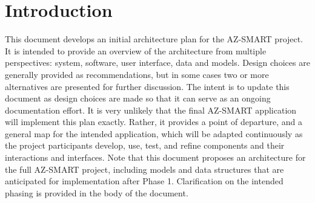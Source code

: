 \section{Introduction}
This document develops an initial architecture plan for the AZ-SMART
project.  It is intended to provide an overview of the architecture
from multiple perspectives: system, software, user interface, data
and models.  Design choices are generally provided as
recommendations, but in some cases two or more alternatives are
presented for further discussion.  The intent is to update this
document as design choices are made so that it can serve as an
ongoing documentation effort.  It is very unlikely that the final
AZ-SMART application will implement this plan exactly.  Rather, it
provides a point of departure, and a general map for the intended
application, which will be adapted continuously as the project
participants develop, use, test, and refine components and their
interactions and interfaces.  Note that this document proposes an
architecture for the full AZ-SMART project, including models and
data structures that are anticipated for implementation after Phase
1.  Clarification on the intended phasing is provided in the body of
the document.
